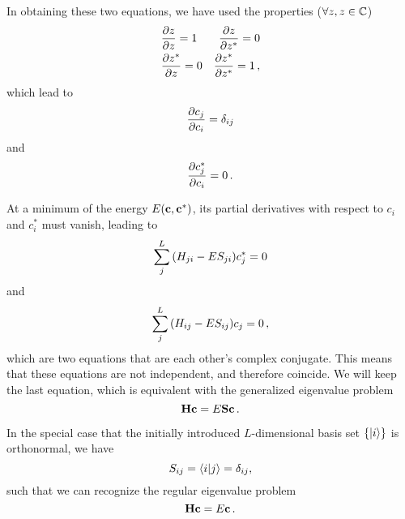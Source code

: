     In obtaining these two equations, we have used the properties ($\forall z, z \in \mathbb{C}$)
    \begin{align}
        &\pdv{z}{z} = 1     &\pdv{z}{z^*} = 0 \\
        &\pdv{z^*}{z} = 0   &\pdv{z^*}{z^*} = 1 \thinspace ,
    \end{align}
    which lead to
    \begin{equation}
        \pdv{c_j}{c_i} = \delta_{ij}
    \end{equation}
    and
    \begin{equation}
        \pdv{c_j^*}{c_i} = 0 \thinspace .
    \end{equation}

    At a minimum of the energy $E(\vb{c}, \vb{c}^*)$, its partial derivatives with respect to $c_i$ and $c_i^*$ must vanish, leading to
    \begin{equation}
        \sum_j^L \qty(H_{ji} - E S_{ji}) c_j^* = 0
    \end{equation}
    and
    \begin{equation}
        \sum_j^L \qty(H_{ij} - E S_{ij}) c_j = 0 \thinspace ,
    \end{equation}
    which are two equations that are each other's complex conjugate. This means that these equations are not independent, and therefore coincide. We will keep the last equation, which is equivalent with the generalized eigenvalue problem
    \begin{equation}
        \vb{H} \vb{c} = E \vb{S} \vb{c} \thinspace .
    \end{equation}

    In the special case that the initially introduced $L$-dimensional basis set $\qty{\ket{i}}$ is orthonormal, we have
    \begin{equation}
        S_{ij} = \braket{i}{j} = \delta_{ij} ,
    \end{equation}
    such that we can recognize the regular eigenvalue problem
    \begin{equation}
        \vb{H} \vb{c} = E \vb{c} \thinspace .
    \end{equation}
